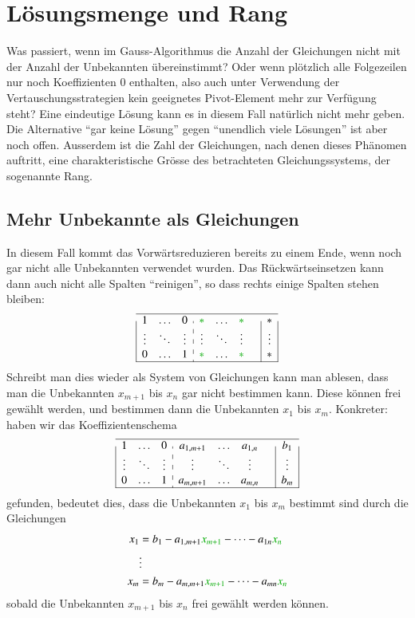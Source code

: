 %
%
%
\section{Lösungsmenge und Rang}
Was passiert, wenn im Gauss-Algorithmus die Anzahl der Gleichungen
nicht mit der Anzahl der Unbekannten übereinstimmt? Oder wenn
plötzlich alle Folgezeilen nur noch Koeffizienten $0$ enthalten,
also auch unter Verwendung der Vertauschungsstrategien kein geeignetes
Pivot-Element mehr zur Verfügung steht? Eine eindeutige Lösung kann
es in diesem Fall natürlich nicht mehr geben.
Die Alternative ``gar keine Lösung'' gegen ``unendlich viele Lösungen''
ist aber noch offen.
Ausserdem ist die Zahl der Gleichungen, nach denen dieses Phänomen
auftritt, eine charakteristische Grösse des betrachteten Gleichungssystems,
der sogenannte Rang.

\subsection{Mehr Unbekannte als Gleichungen}
In diesem Fall kommt das Vorwärtsreduzieren bereits zu einem Ende,
wenn noch gar nicht alle Unbekannten verwendet wurden.
Das Rückwärtseinsetzen kann dann auch nicht alle Spalten ``reinigen'',
so dass rechts einige Spalten stehen bleiben:
\begin{gather}
\definecolor{greenT}{rgb}{0,0.666,0}
\begin{array}{|ccc:cccc|c|}
\hline
1&\dots&0&\color{greenT}*&\dots&\color{greenT}*&&*\\
\vdots&\ddots&\vdots&\vdots&\ddots&\vdots&&\vdots\\
0&\dots&1&\color{greenT}*&\dots&\color{greenT}*&&*\\
\hline
\end{array}
\end{gather}
%
Schreibt man dies wieder als System von Gleichungen kann man ablesen,
dass man die Unbekannten $x_{m+1}$ bis $x_n$ gar nicht bestimmen kann.
Diese können frei gewählt werden, und bestimmen dann die Unbekannten
$x_1$ bis $x_m$.
Konkreter: haben wir das Koeffizientenschema
\begin{gather}
\begin{array}{|ccc:cccc|c|}
\hline
1&\dots&0&a_{1,m+1}&\dots&a_{1,n}&&b_1\\
\vdots&\ddots&\vdots&\vdots&\ddots&\vdots&&\vdots\\
0&\dots&1&a_{m,m+1}&\dots&a_{m,n}&&b_m\\
\hline
\end{array}
\end{gather}
gefunden, bedeutet dies, dass die Unbekannten $x_1$ bis $x_m$ bestimmt
sind durch die Gleichungen
{
\begin{align*}
x_1&=b_1-a_{1,m+1}{\color{greenT}x_{m+1}}-\dots-a_{1n}{\color{greenT}x_n}\\
&\vdots\\
x_m&=b_m-a_{m,m+1}{\color{greenT}x_{m+1}}-\dots-a_{mn}{\color{greenT}x_n}
\end{align*}
}
sobald die Unbekannten $x_{m+1}$ bis $x_n$ frei gewählt werden können.
